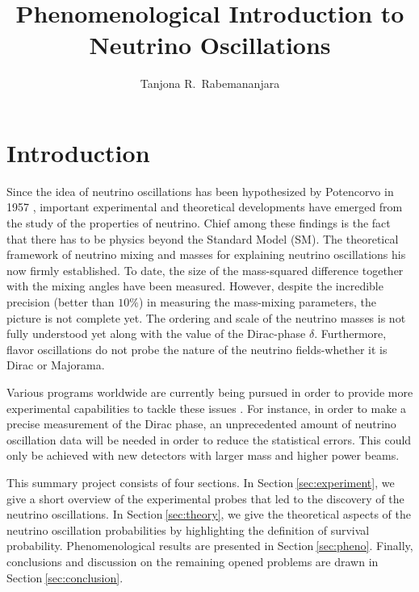\documentclass[twocolumn,secnumarabic,amssymb, nobibnotes, aps, prd,10pt]{revtex4-1}
\newcommand{\Sec}[1]{Section$\:$\ref{#1}}
\begin{document}
\title{\texorpdfstring{Phenomenological Introduction to Neutrino Oscillations}{Phenomenological Introduction to Neutrino Oscillations}}

\author{Tanjona R.\ Rabemananjara}

\maketitle

\section{Introduction}

Since the idea of neutrino oscillations has been hypothesized by Potencorvo in 1957
\cite{Potencorvo:1957cp, Xontecorvo:1957qd}, important experimental and theoretical
developments have emerged from the study of the properties of neutrino. Chief among
these findings is the fact that there has to be physics beyond the Standard Model 
(SM). The theoretical framework of neutrino mixing and masses for explaining neutrino
oscillations his now firmly established. To date, the size of the mass-squared 
difference together with the mixing angles have been measured. However, despite the
incredible precision (better than $10 \%$) in measuring the mass-mixing parameters, 
the picture is not complete yet. The ordering and scale of the neutrino masses is not
fully understood yet along with the value of the Dirac-phase $\delta$. Furthermore, 
flavor oscillations do not probe the nature of the neutrino fields-whether it is Dirac 
or Majorama.

Various programs worldwide are currently being pursued in order to provide more
experimental capabilities to tackle these issues \cite{Acciarri:2015uup, Antonello:2015lea, 
An:2015jdp, Djurcic:2015vqa, Adamson:2016tbq, Kim:2014rfa, Adamson:2016xxw, Abe:2015awa,
Adams:2013qkq}. For instance, in order to make a precise measurement of the Dirac phase, an 
unprecedented amount of neutrino oscillation data will be needed in order to reduce the 
statistical errors. This could only be achieved with new detectors with larger mass and 
higher power beams.

This summary project consists of four sections. In \Sec{sec:experiment}, we give a short
overview of the experimental probes that led to the discovery of the neutrino oscillations.
In \Sec{sec:theory}, we give the theoretical aspects of the neutrino oscillation probabilities
by highlighting the definition of survival probability. Phenomenological results are presented
in \Sec{sec:pheno}. Finally, conclusions and discussion on the remaining opened problems are
drawn in \Sec{sec:conclusion}.
\end{document}
